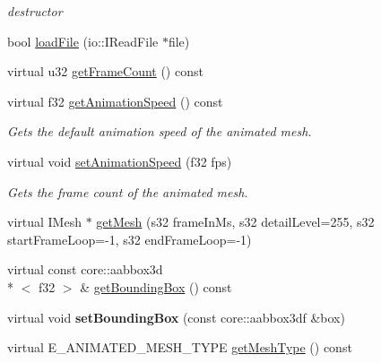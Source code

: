 \begin{DoxyCompactItemize}
\begin{DoxyCompactList}\small\item\em destructor \end{DoxyCompactList}\item 
bool \hyperlink{classirr_1_1scene_1_1_c_q3_level_mesh_a9241443aa74fd7e4a1781112eb705e5a}{load\-File} (io\-::\-I\-Read\-File $\ast$file)
\item 
virtual u32 \hyperlink{classirr_1_1scene_1_1_c_q3_level_mesh_ae0d420750860bad8e6321934b70211a4}{get\-Frame\-Count} () const 
\item 
virtual f32 \hyperlink{classirr_1_1scene_1_1_c_q3_level_mesh_acf1dcb014e387a1f2bec3828f888757b}{get\-Animation\-Speed} () const 
\begin{DoxyCompactList}\small\item\em Gets the default animation speed of the animated mesh. \end{DoxyCompactList}\item 
virtual void \hyperlink{classirr_1_1scene_1_1_c_q3_level_mesh_aa6db1e0cf0fc642ba7b941814fdc71cc}{set\-Animation\-Speed} (f32 fps)
\begin{DoxyCompactList}\small\item\em Gets the frame count of the animated mesh. \end{DoxyCompactList}\item 
virtual I\-Mesh $\ast$ \hyperlink{classirr_1_1scene_1_1_c_q3_level_mesh_a8c3da71c31368805efcb02bd164de760}{get\-Mesh} (s32 frame\-In\-Ms, s32 detail\-Level=255, s32 start\-Frame\-Loop=-\/1, s32 end\-Frame\-Loop=-\/1)
\item 
virtual const core\-::aabbox3d\\*
$<$ f32 $>$ \& \hyperlink{classirr_1_1scene_1_1_c_q3_level_mesh_a74fd19ef4efd263a606a1efe13396931}{get\-Bounding\-Box} () const 
\item 
\hypertarget{classirr_1_1scene_1_1_c_q3_level_mesh_a09166afb1b6a5b53cfd8fe3d4984d3e1}{virtual void {\bfseries set\-Bounding\-Box} (const core\-::aabbox3df \&box)}\label{classirr_1_1scene_1_1_c_q3_level_mesh_a09166afb1b6a5b53cfd8fe3d4984d3e1}

\item 
\hypertarget{classirr_1_1scene_1_1_c_q3_level_mesh_a888e5e4ae31cd927826c077f601716e7}{virtual E\-\_\-\-A\-N\-I\-M\-A\-T\-E\-D\-\_\-\-M\-E\-S\-H\-\_\-\-T\-Y\-P\-E \hyperlink{classirr_1_1scene_1_1_c_q3_level_mesh_a888e5e4ae31cd927826c077f601716e7}{get\-Mesh\-Type} () const }\label{classirr_1_1scene_1_1_c_q3_level_mesh_a888e5e4ae31cd927826c077f601716e7}


\end{DoxyCompactItemize}
